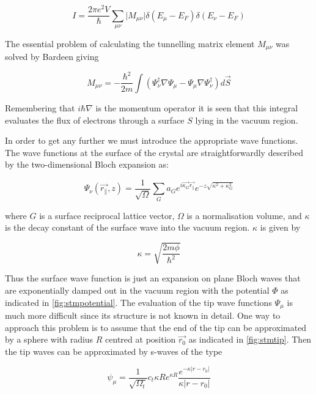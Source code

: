 \begin{equation}
I=\frac{2\pi e^2V}{\hbar}\sum_{\mu\nu}\vert M_{\mu\nu}\vert\delta(E_{\mu}-E_F)\delta(E_{\nu}-E_F)
\end{equation}

The essential problem of calculating the tunnelling matrix element $M_{\mu\nu}$ was solved by Bardeen \cite{Bardeen} giving

\begin{equation}
M_{\mu\nu}=-\frac{\hbar^2}{2m}\int(\Psi_{\nu}^{\dag}\nabla\Psi_{\mu}-\Psi_{\mu} \nabla\Psi_{\nu}^{\dag})d\vec{S}
\end{equation}

Remembering that $i\hbar\nabla$ is the momentum operator it is seen that this integral evaluates the flux of electrons through a surface $S$ lying in the vacuum region.

In order to get any further we must introduce the appropriate wave functions. The wave functions at the surface of the crystal are straightforwardly described by the two-dimensional Bloch expansion as:

\begin{equation}
\Psi_{\nu}(\vec{r_{\parallel}},z)=\frac{1}{\sqrt{\Omega}}\sum_Ga_Ge^{i\vec{\kappa_G}\vec{r_{\parallel}}}e^{-z\sqrt{\kappa^2+\kappa_G^2}}
\end{equation}

\noindent where $G$ is a surface reciprocal lattice vector, $\Omega$ is a normalisation volume, and $\kappa$ is the decay constant of the surface wave into the vacuum region. $\kappa$ is given by

\begin{equation}
\kappa=\sqrt{\frac{2m\phi}{\hbar^2}}
\end{equation}

Thus the surface wave function is just an expansion on plane Bloch waves that are exponentially damped out in the vacuum region with the potential $\Phi$ as indicated in \autoref{fig:stmpotential}. The evaluation of the tip wave functions $\Psi_\mu$ is much more difficult since its structure is not known in detail. One way to approach this problem is to assume that the end of the tip can be approximated by a sphere with radius $R$ centred at position $\vec{r_0}$ as indicated in \autoref{fig:stmtip}. Then the tip waves can be approximated by s-waves of the type

\begin{equation}
\psi_{\mu}=\frac{1}{\sqrt{\Omega_t}}c_t \kappa Re^{\kappa R}\frac{e^{-\kappa\vert r-r_0\vert}}{\kappa\vert r-r_0\vert}
\end{equation}
 
